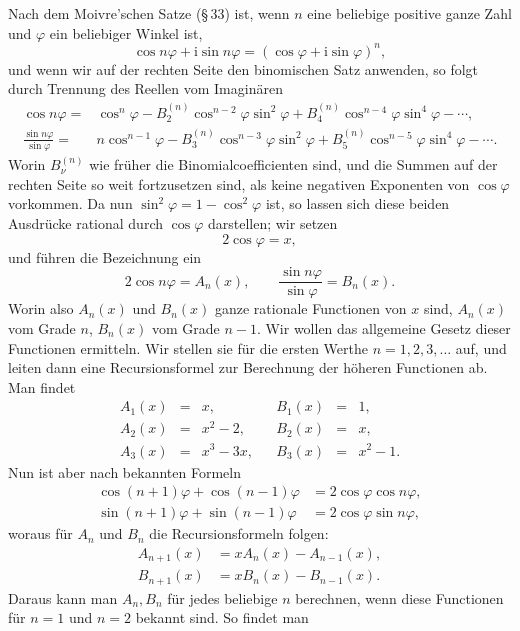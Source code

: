 \documentclass[11pt]{article}
\providecommand{\ii}{\mathrm{i}}
\begin{document}
Nach dem Moivre'schen Satze (\S\,33) ist, wenn $n$ eine beliebige positive ganze Zahl und $\varphi$ ein beliebiger Winkel ist,
\[
\tag{1}        \cos n\varphi+\ii\sin n\varphi=(\cos\varphi+\ii\sin\varphi)^n,
\]
und wenn wir auf der rechten Seite den binomischen Satz anwenden, so folgt durch Trennung des Reellen vom Imaginären
\[
\tag{2}\begin{aligned}
\cos n\varphi={}&\cos^n\varphi-B_2^{(n)}\cos^{n-2}\varphi\sin^2\varphi
+B_4^{(n)}\cos^{n-4}\varphi\sin^4\varphi-\cdots,\\
\frac{\sin n\varphi}{\sin\varphi}={}&n\cos^{n-1}\varphi
-B_3^{(n)}\cos^{n-3}\varphi\sin^2\varphi
+B_5^{(n)}\cos^{n-5}\varphi\sin^4\varphi-\cdots.
\end{aligned}
\]
Worin $B_\nu^{(n)}$ wie früher die Binomialcoefficienten sind, und die Summen auf der rechten Seite so weit fortzusetzen sind, als keine negativen Exponenten von $\cos\varphi$ vorkommen. Da nun $\sin^2\varphi=1-\cos^2\varphi$ ist, so lassen sich diese beiden Ausdrücke rational durch $\cos\varphi$ darstellen; wir setzen
\[
\tag{3}        2\cos\varphi=x,
\]
und führen die Bezeichnung ein
\[
\tag{4}        2\cos n\varphi=A_n(x),\qquad
        \frac{\sin n\varphi}{\sin\varphi}=B_n(x).
\]
Worin also $A_n(x)$ und $B_n(x)$ ganze rationale Functionen von $x$ sind, $A_n(x)$ vom Grade $n$, $B_n(x)$ vom Grade $n-1$. Wir wollen das allgemeine Gesetz dieser Functionen ermitteln. Wir stellen sie für die ersten Werthe $n=1,2,3,\ldots$ auf, und leiten dann eine Recursionsformel zur Berechnung der höheren Functionen ab. Man findet
\[
\tag{5}\begin{array}{rclcrcl}
A_1(x)&=&x,       && B_1(x)&=&1,\\
A_2(x)&=&x^2-2,   && B_2(x)&=&x,\\
A_3(x)&=&x^3-3x,  && B_3(x)&=&x^2-1.
\end{array}
\]
Nun ist aber nach bekannten Formeln
\[
\begin{aligned}
\cos(n+1)\varphi+\cos(n-1)\varphi&=2\cos\varphi\cos n\varphi,\\
\sin(n+1)\varphi+\sin(n-1)\varphi&=2\cos\varphi\sin n\varphi,
\end{aligned}
\]
woraus für $A_n$ und $B_n$ die Recursionsformeln folgen:
\[
\tag{6}\begin{aligned}
A_{n+1}(x)&=xA_n(x)-A_{n-1}(x),\\
B_{n+1}(x)&=xB_n(x)-B_{n-1}(x).
\end{aligned}
\]
Daraus kann man $A_n,B_n$ für jedes beliebige $n$ berechnen, wenn diese Functionen für $n=1$ und $n=2$ bekannt sind. So findet man
\end{document}
